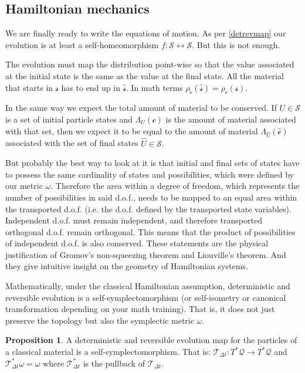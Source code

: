 \documentclass[aps,pra,10pt,twocolumn,floatfix,nofootinbib]{revtex4-1}
\numberwithin{equation}{section}
\theoremstyle{definition}
\newtheorem{prop}[equation]{Proposition}
\begin{document}
\subsection{Hamiltonian mechanics}

We are finally ready to write the equations of motion. As per \ref{detrevmap} our evolution is at least a self-homeomorphism $f:\mathcal{S} \leftrightarrow \mathcal{S}$. But this is not enough.

The evolution must map the distribution point-wise so that the value associated at the initial state is the same as the value at the final state. All the material that starts in $\mathcal{s}$ has to end up in $\hat{\mathcal{s}}$. In math terms $\rho_{\hat{\mathcal{c}}} (\hat{\mathcal{s}}) = \rho_\mathcal{c}(\mathcal{s})$.

In the same way we expect the total amount of material to be conserved. If $U \in \mathcal{S}$ is a set of initial particle states and $\Lambda_U(\mathcal{c})$ is the amount of material associated with that set, then we expect it to be equal to the amount of material $\Lambda_{\hat{U}}(\hat{\mathcal{c}})$ associated with the set of final states $\hat{U} \in \mathcal{S}$.

But probably the best way to look at it is that initial and final sets of states have to possess the same cardinality of states and possibilities, which were defined by our metric $\omega$. Therefore the area within a degree of freedom, which represents the number of possibilities in said d.o.f., needs to be mapped to an equal area within the transported d.o.f. (i.e. the d.o.f. defined by the transported state variables). Independent d.o.f. must remain independent, and therefore transported orthogonal d.o.f. remain orthogonal. This means that the product of possibilities of independent d.o.f. is also conserved. These statements are the physical justification of Gromov's non-squeezing theorem and Liouville's theorem. And they give intuitive insight on the geometry of Hamiltonian systems.

Mathematically, under the classical Hamiltonian assumption,  deterministic and reversible evolution is a self-symplectomorphism (or self-isometry or canonical transformation depending on your math training). That is, it does not just preserve the topology but also the symplectic metric $\omega$.

\begin{prop}\label{canonical_transformation}
	A deterministic and reversible evolution map for the particles of a classical material is a self-symplectomorphism. That is: $\mathcal{T}_{\Delta t}: T^*\mathcal{Q} \rightarrow T^*\mathcal{Q}$ and $\mathcal{T}_{\Delta t}^*\omega = \omega$ where $\mathcal{T}_{\Delta t}^*$ is the pullback of $\mathcal{T}_{\Delta t}$.
\end{prop}
\end{document}

